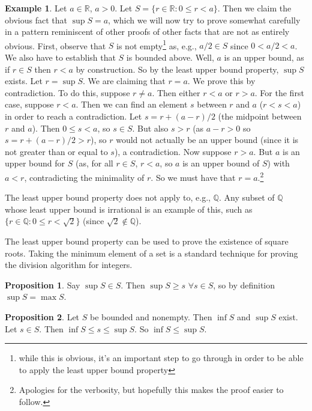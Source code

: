 \documentclass{article}
\theoremstyle{definition}
\newtheorem{example}{Example}[section]
\newtheorem{proposition}{Proposition}[section]
\begin{document}
\begin{example} \label{supexample}
Let $a \in \mathbb{R}$, $a > 0$. Let $S = \{r \in \mathbb{R} : 0 \leq r < a\}$. Then we claim the obvious fact that $\sup S = a$, which we will now try to prove somewhat carefully in a pattern reminiscent of other proofs of other facts that are not as entirely obvious. First, observe that $S$ is not empty\footnote{while this is obvious, it's an important step to go through in order to be able to apply the least upper bound property} as, e.g., $a/2 \in S$ since $0 < a/2 < a$. We also have to establish that $S$ is bounded above. Well, $a$ is an upper bound, as if $r \in S$ then $r < a$ by construction. So by the least upper bound property, $\sup S$ exists. Let $r = \sup S$. We are claiming that $r = a$. We prove this by contradiction. To do this, suppose $r \neq a$. Then either $r < a$ or $r > a$. For the first case, suppose $r < a$. Then we can find an element $s$ between $r$ and $a$ ($r < s < a$) in order to reach a contradiction. Let $s = r + (a - r)/2$ (the midpoint between $r$ and $a$). Then $0 \leq s < a$, so $s \in S$. But also $s > r$ (as $a - r > 0$ so $s = r + (a - r)/2 > r$), so $r$ would not actually be an upper bound (since it is not greater than or equal to $s$), a contradiction. Now suppose $r > a$. But $a$ is an upper bound for $S$ (as, for all $r \in S$, $r < a$, so $a$ is an upper bound of $S$) with $a < r$, contradicting the minimality of $r$. So we must have that $r = a$.\footnote{Apologies for the verbosity, but hopefully this makes the proof easier to follow.}
\end{example}

The least upper bound property does not apply to, e.g., $\mathbb{Q}$. Any subset of $\mathbb{Q}$ whose least upper bound is irrational is an example of this, such as $\{r \in \mathbb{Q} : 0 \leq r < \sqrt{2}\}$ (since $\sqrt{2} \notin \mathbb{Q}$).

The least upper bound property can be used to prove the existence of square roots. Taking the minimum element of a set is a standard technique for proving the division algorithm for integers. 

\begin{proposition}
Say $\sup S \in S$. Then $\sup S \ge s$ $\forall s \in S$, so by definition $\sup S = \max S$.
\end{proposition}

\begin{proposition} \label{bound-comparison}
Let $S$ be bounded and nonempty. Then $\inf S$ and $\sup S$ exist. Let $s \in S$. Then $\inf S \le s \le \sup S$.
So $\inf S \le \sup S$.
\end{proposition}
\end{document}
